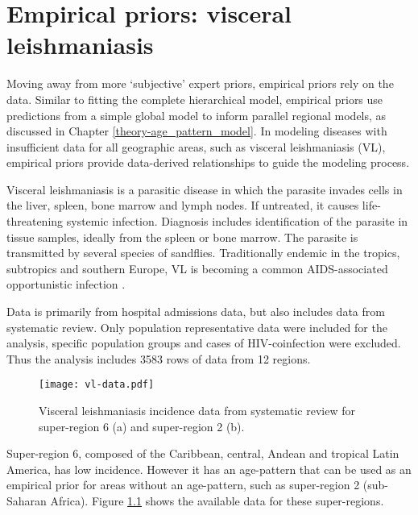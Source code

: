 \chapter{Empirical priors: visceral leishmaniasis}
\label{applications-priors_empirical}

Moving away from more `subjective' expert priors, empirical priors rely on the data.  Similar to fitting the complete hierarchical model, empirical priors use predictions from a simple global model to inform parallel regional models, as discussed in Chapter \ref{theory-age_pattern_model}.  In modeling diseases with insufficient data for all geographic areas, such as visceral leishmaniasis (VL), empirical priors provide data-derived relationships to guide the modeling process.

Visceral leishmaniasis is a parasitic disease in which the parasite invades cells in the liver, spleen, bone marrow and lymph nodes.  If untreated, it causes life-threatening systemic infection.  Diagnosis includes identification of the parasite in tissue samples, ideally from the spleen or bone marrow.  The parasite is transmitted by several species of sandflies.  Traditionally  endemic in the tropics, subtropics and southern Europe, VL is becoming a common AIDS-associated opportunistic infection \cite{herwaldt_leishmaniasis_1999, zeledon_hemoflagellates_1996}.

Data is primarily from hospital admissions data, but also includes data from systematic review.  Only population representative data were included for the analysis, specific population groups and cases of HIV-coinfection were excluded.  Thus the analysis includes 3583 rows of data from 12 regions.

    \begin{figure}[h]
        \begin{center}
            \texttt{[image: vl-data.pdf]}
            \caption{Visceral leishmaniasis incidence data from systematic review for super-region 6 (a) and super-region 2 (b).}
            \label{fig:app-vl data}
        \end{center}
    \end{figure}

Super-region 6, composed of the Caribbean, central, Andean and tropical Latin America, has low incidence.  However it has an age-pattern that can be used as an empirical prior for areas without an age-pattern, such as super-region 2 (sub-Saharan Africa).  Figure \ref{fig:app-vl data} shows the available data for these super-regions.

